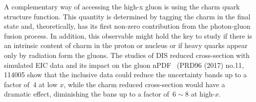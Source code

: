 A complementary way of accessing the high-x gluon is using the charm quark structure function. This quantity is determined by tagging the charm in the final state and, theoretically, has its first non-zero contribution from the photon-gluon fusion process. In addition, this observable might hold the key to study if there is an intrinsic content of charm in the proton or nucleus or if heavy quarks appear only by radiation form the gluons. The studies of DIS reduced cross-section with simulated EIC data and its impact on the gluon nPDF~\cite{FIXME} (PRD96 (2017) no.11, 114005 show that the inclusive data could reduce the uncertainty bands up to a factor of~4 at low $x$, while the charm reduced cross-section would have a dramatic effect, diminishing the bans up to a factor of~$6\sim 8$ at high-$x$.   





%



